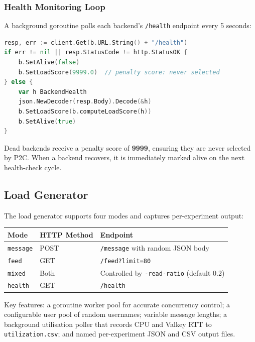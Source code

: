 \documentclass[12pt,a4paper]{article}
\begin{document}
\subsubsection{Health Monitoring Loop}

A background goroutine polls each backend's \texttt{/health} endpoint every 5 seconds:

\begin{lstlisting}[language=Go, caption={Health loop updating alive status and load score atomically}]
resp, err := client.Get(b.URL.String() + "/health")
if err != nil || resp.StatusCode != http.StatusOK {
    b.SetAlive(false)
    b.SetLoadScore(9999.0)  // penalty score: never selected
} else {
    var h BackendHealth
    json.NewDecoder(resp.Body).Decode(&h)
    b.SetLoadScore(b.computeLoadScore(h))
    b.SetAlive(true)
}
\end{lstlisting}

Dead backends receive a penalty score of \textbf{9999}, ensuring they are never selected by P2C. When a backend recovers, it is immediately marked alive on the next health-check cycle.

\subsection{Load Generator}

The load generator supports four modes and captures per-experiment output:

\begin{center}
\begin{tabular}{lll}
\toprule
\textbf{Mode} & \textbf{HTTP Method} & \textbf{Endpoint} \\
\midrule
\texttt{message} & POST & \texttt{/message} with random JSON body \\
\texttt{feed}    & GET  & \texttt{/feed?limit=80} \\
\texttt{mixed}   & Both & Controlled by \texttt{-read-ratio} (default 0.2) \\
\texttt{health}  & GET  & \texttt{/health} \\
\bottomrule
\end{tabular}
\end{center}

Key features: a goroutine worker pool for accurate concurrency control; a configurable user pool of random usernames; variable message lengths; a background utilisation poller that records CPU and Valkey RTT to \texttt{utilization.csv}; and named per-experiment JSON and CSV output files.
\end{document}
